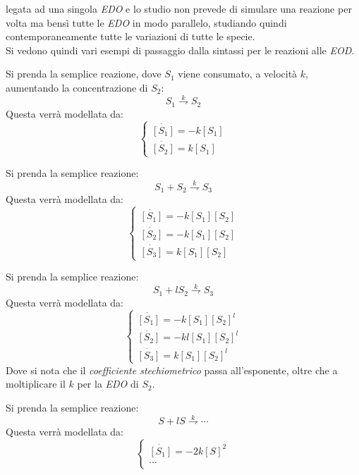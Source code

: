 \documentclass[a4paper,12pt, oneside]{book}
\begin{document}
legata ad una singola \textit{EDO} e lo studio non prevede di simulare una
reazione per volta ma bensì tutte le \textit{EDO} in modo parallelo, studiando
quindi contemporaneamente tutte le variazioni di tutte le specie.\\
Si vedono quindi vari esempi di passaggio dalla sintassi per le reazioni alle
\textit{EOD}.
\begin{esempio}
  Si prenda la semplice reazione, dove $S_1$ viene consumato, a velocità $k$,
  aumentando la concentrazione di $S_2$:
  \[S_1 \stackrel{k}{\rightharpoondown} S_2\]
  Questa verrà modellata da:
  \[
    \begin{cases}
      \dot{[S_1]}=-k[S_1]\\
      \dot{[S_2]}=k[S_1]
    \end{cases}
  \]
\end{esempio}
\begin{esempio}
  Si prenda la semplice reazione:
  \[S_1 +S_2\stackrel{k}{\rightharpoondown} S_3\]
  Questa verrà modellata da:
  \[
    \begin{cases}
      \dot{[S_1]}=-k[S_1][S_2]\\
      \dot{[S_2]}=-k[S_1][S_2]\\
      \dot{[S_3]}=k[S_1][S_2]
    \end{cases}
  \]
\end{esempio}
\begin{esempio}
  Si prenda la semplice reazione:
  \[S_1 +lS_2\stackrel{k}{\rightharpoondown} S_3\]
  Questa verrà modellata da:
  \[
    \begin{cases}
      \dot{[S_1]}=-k[S_1][S_2]^l\\
      \dot{[S_2]}=-kl[S_1][S_2]^l\\
      \dot{[S_3]}=k[S_1][S_2]^l
    \end{cases}
  \]
  Dove si nota che il \textit{coefficiente stechiometrico} passa all'esponente,
  oltre che a moltiplicare il $k$ per la \textit{EDO} di $S_2$.
\end{esempio}
\begin{esempio}
  Si prenda la semplice reazione:
  \[S +lS\stackrel{k}{\rightharpoondown} \cdots\]
  Questa verrà modellata da:
  \[
    \begin{cases}
      \dot{[S_1]}=-2k[S]^2\\
      \cdots
    \end{cases}
  \]
\end{esempio}
\end{document}
